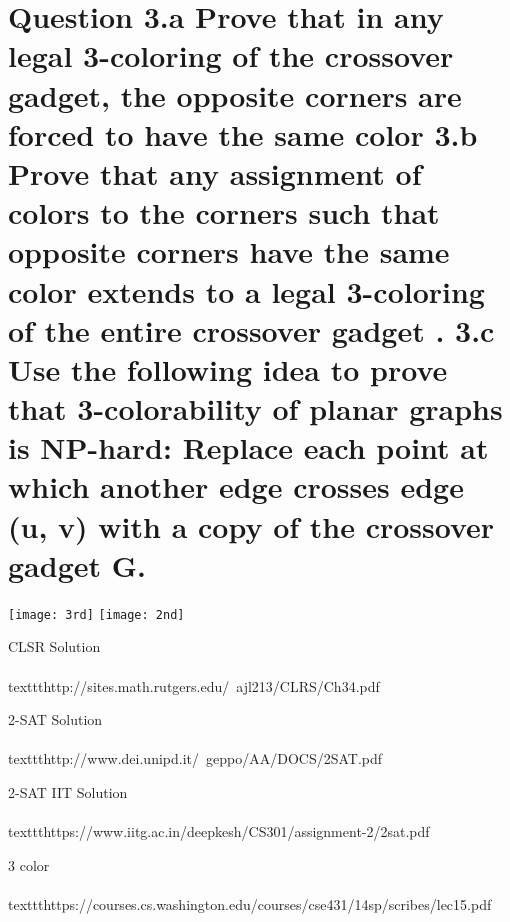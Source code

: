 \documentclass[5pt]{article}
\begin{document}
\section{Question 3.a Prove that in any legal 3-coloring of the crossover gadget, the opposite corners are forced to have
the same color 3.b Prove that any assignment of colors to the corners such that opposite corners have the same color
extends to a legal 3-coloring of the entire crossover gadget .  3.c Use the following idea to prove that 3-colorability of planar graphs is NP-hard: Replace each point
at which another edge crosses edge (u, v) with a copy of the crossover gadget G.  }

\setlength{\parskip}{1.2em}
\setlength{\parindent}{0em}

\texttt{[image: 3rd]}
\texttt{[image: 2nd]}







\begin{thebibliography}{9}
CLSR Solution
\\\\texttt{http://sites.math.rutgers.edu/~ajl213/CLRS/Ch34.pdf}

2-SAT Solution
\\\\texttt{http://www.dei.unipd.it/~geppo/AA/DOCS/2SAT.pdf}

2-SAT IIT Solution
\\\\texttt{https://www.iitg.ac.in/deepkesh/CS301/assignment-2/2sat.pdf}

3 color
\\\\texttt{https://courses.cs.washington.edu/courses/cse431/14sp/scribes/lec15.pdf}

\end{thebibliography}
\end{document}
